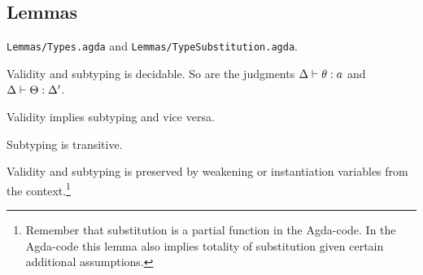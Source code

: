 \subsection{Lemmas}

\texttt{Lemmas/Types.agda} and \texttt{Lemmas/TypeSubstitution.agda}.

\begin{lemma}
  \label{lemma:typdec}
  Validity and subtyping is decidable. So are the judgments
  ${\Delta} |- {\theta} : {a}$ and
  ${\Delta} |- {\Theta} : {\Delta'}$.
\end{lemma}

\begin{lemma}
  \label{lemma:typeq}
  Validity implies subtyping and vice versa.
\end{lemma}

\begin{lemma}
  \label{lemma:transitive}
  Subtyping is transitive.
\end{lemma}

\begin{lemma}
  \label{lemma:typ-context}
  Validity and subtyping is preserved by weakening or instantiation variables
  from the context.\footnote{Remember that substitution is a partial function in
    the Agda-code. In the Agda-code this lemma also implies totality of
    substitution given certain additional assumptions.}
\end{lemma}

